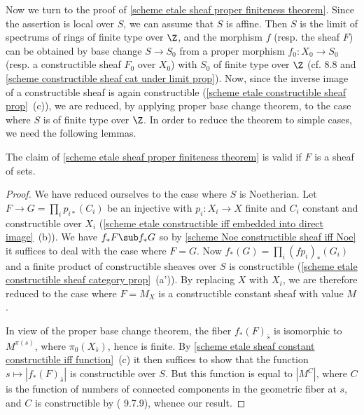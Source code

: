 Now we turn to the proof of \cref{scheme etale sheaf proper finiteness theorem}. Since the assertion is local over $S$, we can assume that $S$ is affine. Then $S$ is the limit of spectrums of rings of finite type over $\Z$, and the morphism $f$ (resp. the sheaf $F$) can be obtained by base change $S\to S_0$ from a proper morphism $f_0:X_0\to S_0$ (resp. a constructible sheaf $F_0$ over $X_0$) with $S_0$ of finite type over $\Z$ (cf. \cite{EGA4-3} 8.8 and \cref{scheme constructible sheaf cat under limit prop}). Now, since the inverse image of a constructible sheaf is again constructible (\cref{scheme etale constructible sheaf prop}~(c)), we are reduced, by applying proper base change theorem, to the case where $S$ is of finite type over $\Z$. In order to reduce the theorem to simple cases, we need the following lemmas.

\begin{lemma}\label{scheme etale sheaf of set proper finiteness theorem}
The claim of \cref{scheme etale sheaf proper finiteness theorem} is valid if $F$ is a sheaf of sets.
\end{lemma}
\begin{proof}
We have reduced ourselves to the case where $S$ is Noetherian. Let $F\to G=\prod_ip_{i*}(C_i)$ be an injective with $p_i:X_i\to X$ finite and $C_i$ constant and constructible over $X_i$ (\cref{scheme etale constructible iff embedded into direct image}~(b)). We have $f_*F\sub f_*G$ so by \cref{scheme Noe constructible sheaf iff Noe} it suffices to deal with the case where $F=G$. Now $f_*(G)=\prod_i(fp_i)_*(G_i)$ and a finite product of constructible sheaves over $S$ is constructible (\cref{scheme etale constructible sheaf category prop}~(a')). By replacing $X$ with $X_i$, we are therefore reduced to the case where $F=M_X$ is a constructible constant sheaf with value $M$.\par
In view of the proper base change theorem, the fiber $f_*(F)_{\bar{s}}$ is isomorphic to $M^{\pi(s)}$, where $\pi_0(X_{\bar{s}})$, hence is finite. By \cref{scheme etale sheaf constant constructible iff function}~(c) it then suffices to show that the function $s\mapsto|f_*(F)_{\bar{s}}|$ is constructible over $S$. But this function is equal to $|M^C|$, where $C$ is the function of numbers of connected components in the geometric fiber at $s$, and $C$ is constructible by (\cite{EGA4} 9.7.9), whence our result.
\end{proof}

